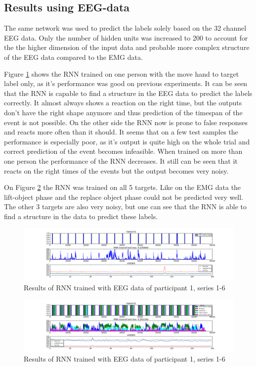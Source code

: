 \documentclass{article} %
\begin{document}
\subsection{Results using EEG-data}
The same network was used to predict the labels solely based on the 32 channel EEG data. Only the number of hidden units was increased to 200 to account for the the higher dimension of the input data and probable more complex structure of the EEG data compared to the EMG data.

Figure \ref{fig:eeg_RNN_1} shows the RNN trained on one person with the move hand to target label only, as it's performance was good on previous experiments. It can be seen that the RNN is capable to find a structure in the EEG data to predict the labels correctly. It almost always shows a reaction on the right time, but the outputs don't have the right shape anymore and thus prediction of the timespan of the event is not possible. On the other side the RNN now is prone to false responses and reacts more often than it should. It seems that on a few test samples the performance is especially poor, as it's output is quite high on the whole trial and correct prediction of the event becomes infeasible. When trained on more than one person the performance of the RNN decreases. It still can be seen that it reacts on the right times of the events but the output becomes very noisy.

On Figure \ref{fig:eeg_RNN_2} the RNN was trained on all 5 targets. Like on the EMG data the lift-object phase and the replace object phase could not be predicted very well. The other 3 targets are also very noisy, but one can see that the RNN is able to find a structure in the data to predict these labels.

\begin{figure}
	\centering
	\includegraphics[trim=5.2cm 0.5cm 5cm 0.5cm, clip=true, width=1.0\textwidth]{images/EEG-results_participant_1_series_1-6_event_1.png}
	\caption{Results of RNN trained with EEG data of participant 1, series 1-6}
	\label{fig:eeg_RNN_1}
\end{figure}

\begin{figure}
	\centering
	\includegraphics[trim=5.2cm 0.5cm 5cm 0.5cm, clip=true, width=1.0\textwidth]{images/EEG-results_participant_1_series_1-6_event_1-5.png}
	\caption{Results of RNN trained with EEG data of participant 1, series 1-6}
	\label{fig:eeg_RNN_2}
\end{figure}
\end{document}
